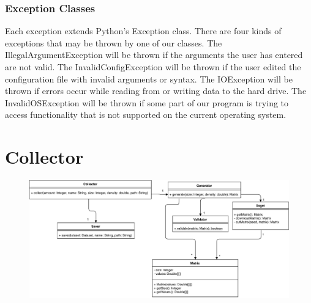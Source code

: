 \documentclass[parskip=full]{scrartcl}
\begin{document}
\subsubsection{Exception Classes}

\begin{figure}[h]
\begin{center}


\label{Exception Classes}
\end{center}
\end{figure}
\newpage

Each \gls{exception} extends Python's Exception class.
There are four kinds of \glspl{exception} that may be thrown by one of our classes.\newline\newline
The IllegalArgumentException will be thrown if the arguments the user has entered are not valid.\newline\newline
The InvalidConfigException will be thrown if the user edited the configuration file with invalid arguments or syntax.\newline\newline
The IOException will be thrown if errors occur while reading from or writing data to the hard drive.\newline\newline
The InvalidOSException will be thrown if some part of our program is trying to access functionality that is not supported on the current operating system.

\section{Collector}
\begin{figure}[h]
\begin{center}
\includegraphics[width=\textwidth, height= \textheight, keepaspectratio]{ClassDiagrams/PDF/Collector_classdiagram.pdf}
%
\label{Activity Diagrams}
\end{center}
\end{figure}
\end{document}
